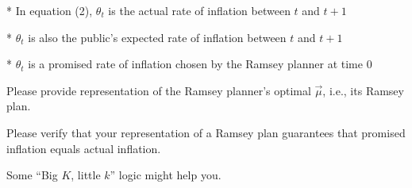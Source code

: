   * In equation (2), $ \theta_t $ is the actual rate of inflation
  between $ t $ and $ t+1 $
  
  * $ \theta_t $ is also the public's
  expected rate of inflation between $ t $ and $ t+1 $

  * $ \theta_t $ is a promised rate of inflation
  chosen by the Ramsey planner at time $ 0 $  


\medskip 
{} Please provide  representation of the Ramsey planner's optimal  $\vec \mu$, i.e., its Ramsey plan.


\medskip
{} Please verify that your representation  of a Ramsey plan guarantees that promised
inflation equals actual inflation. 


\medskip {} Some  ``Big $K$, little $k$'' logic might help you.


\bye






\bye
